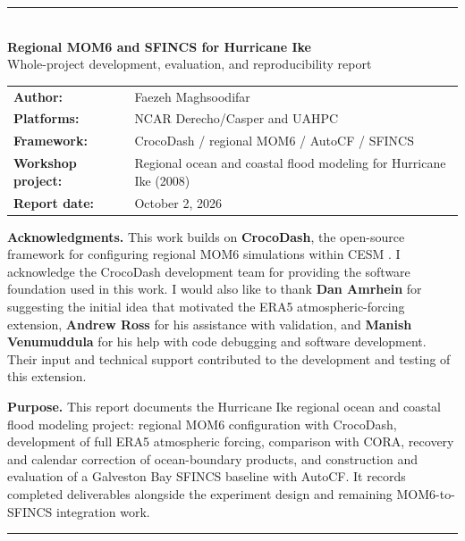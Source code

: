\documentclass[11pt]{article}
\begin{document}
\begin{titlepage}
\thispagestyle{empty}
\vspace*{1.0cm}
{\color{navy}\rule{\textwidth}{1.2pt}}\\[0.8cm]
{\Huge\bfseries\color{navy} Regional MOM6 and SFINCS for Hurricane Ike}\\[0.35cm]
{\Large Whole-project development, evaluation, and reproducibility report}\\[1.2cm]

\begin{tabular}{@{}ll@{}}
\textbf{Author:} & Faezeh Maghsoodifar \\
\textbf{Platforms:} & NCAR Derecho/Casper and UAHPC \\
\textbf{Framework:} & CrocoDash / regional MOM6 / AutoCF / SFINCS \\
\textbf{Workshop project:} & Regional ocean and coastal flood modeling for Hurricane Ike (2008) \\
\textbf{Report date:} & October 2, 2026 \\
\end{tabular}

\vspace{0.8cm}
\begin{tcolorbox}[colback=white,colframe=linegray,boxrule=0.6pt,arc=2mm,left=4mm,right=4mm,top=3mm,bottom=3mm]
\textbf{Acknowledgments.} This work builds on \textbf{CrocoDash}, the open-source framework for configuring regional MOM6 simulations within CESM \cite{crocodash}. I acknowledge the CrocoDash development team for providing the software foundation used in this work. I would also like to thank \textbf{Dan Amrhein} for suggesting the initial idea that motivated the ERA5 atmospheric-forcing extension, \textbf{Andrew Ross} for his assistance with validation, and \textbf{Manish Venumuddula} for his help with code debugging and software development. Their input and technical support contributed to the development and testing of this extension.
\end{tcolorbox}

\vfill
\begin{keybox}
\textbf{Purpose.} This report documents the Hurricane Ike regional ocean and coastal flood modeling project: regional MOM6 configuration with CrocoDash, development of full ERA5 atmospheric forcing, comparison with CORA, recovery and calendar correction of ocean-boundary products, and construction and evaluation of a Galveston Bay SFINCS baseline with AutoCF. It records completed deliverables alongside the experiment design and remaining MOM6-to-SFINCS integration work.
\end{keybox}
\vfill
{\color{navy}\rule{\textwidth}{1.2pt}}
\end{titlepage}
\end{document}
